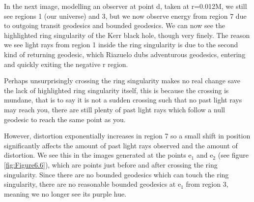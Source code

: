 \documentclass[oneside,openright,frontopenright, singlespacing]{dmathesis}
\begin{document}
\vspace{1em}
	In the next image, modelling an observer at point d, taken at r=0.012M, we still see regions 1 (our universe) and 3, but we now observe energy from region 7 due to outgoing transit geodesics and bounded geodesics. We can now see the highlighted ring singularity of the Kerr black hole, though very finely. The reason we see light rays from region 1 inside the ring singularity is due to the second kind of returning geodesic, which Riazuelo dubs adventurous geodesics, entering and quickly exiting the negative r region.

\vspace{1em}
	Perhaps unsurprisingly crossing the ring singularity makes no real change save the lack of highlighted ring singularity itself, this is because the crossing is mundane, that is to say it is not a sudden crossing such that no past light rays may reach you, there are still plenty of past light rays which follow a null geodesic to reach the same point as you.

\vspace{1em}
	However, distortion exponentially increases in region 7 so a small shift in position significantly affects the amount of past light rays observed and the amount of distortion. We see this in the images generated at the points e$_1$ and e$_2$ (see figure \ref{fig:Figure6.6}), which are points just before and after crossing the ring singularity. Since there are no bounded geodesics which can touch the ring singularity, there are no reasonable bounded geodesics at e$_1$ from region 3, meaning we no longer see its purple hue.
\end{document}
